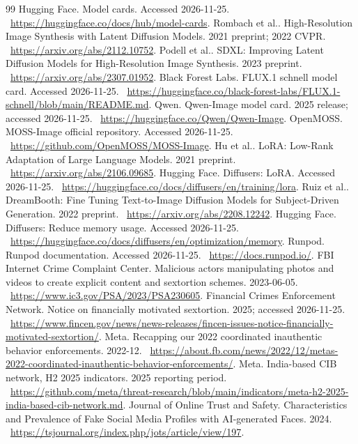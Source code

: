 \documentclass[10pt,a4paper]{article}
\begin{document}
\begin{thebibliography}{99}
 Hugging Face. Model cards. Accessed 2026-11-25. \ \url{https://huggingface.co/docs/hub/model-cards}.
 Rombach et al.. High-Resolution Image Synthesis with Latent Diffusion Models. 2021 preprint; 2022 CVPR. \ \url{https://arxiv.org/abs/2112.10752}.
 Podell et al.. SDXL: Improving Latent Diffusion Models for High-Resolution Image Synthesis. 2023 preprint. \ \url{https://arxiv.org/abs/2307.01952}.
 Black Forest Labs. FLUX.1 schnell model card. Accessed 2026-11-25. \ \url{https://huggingface.co/black-forest-labs/FLUX.1-schnell/blob/main/README.md}.
 Qwen. Qwen-Image model card. 2025 release; accessed 2026-11-25. \ \url{https://huggingface.co/Qwen/Qwen-Image}.
 OpenMOSS. MOSS-Image official repository. Accessed 2026-11-25. \ \url{https://github.com/OpenMOSS/MOSS-Image}.
 Hu et al.. LoRA: Low-Rank Adaptation of Large Language Models. 2021 preprint. \ \url{https://arxiv.org/abs/2106.09685}.
 Hugging Face. Diffusers: LoRA. Accessed 2026-11-25. \ \url{https://huggingface.co/docs/diffusers/en/training/lora}.
 Ruiz et al.. DreamBooth: Fine Tuning Text-to-Image Diffusion Models for Subject-Driven Generation. 2022 preprint. \ \url{https://arxiv.org/abs/2208.12242}.
 Hugging Face. Diffusers: Reduce memory usage. Accessed 2026-11-25. \ \url{https://huggingface.co/docs/diffusers/en/optimization/memory}.
 Runpod. Runpod documentation. Accessed 2026-11-25. \ \url{https://docs.runpod.io/}.
 FBI Internet Crime Complaint Center. Malicious actors manipulating photos and videos to create explicit content and sextortion schemes. 2023-06-05. \ \url{https://www.ic3.gov/PSA/2023/PSA230605}.
 Financial Crimes Enforcement Network. Notice on financially motivated sextortion. 2025; accessed 2026-11-25. \ \url{https://www.fincen.gov/news/news-releases/fincen-issues-notice-financially-motivated-sextortion/}.
 Meta. Recapping our 2022 coordinated inauthentic behavior enforcements. 2022-12. \ \url{https://about.fb.com/news/2022/12/metas-2022-coordinated-inauthentic-behavior-enforcements/}.
 Meta. India-based CIB network, H2 2025 indicators. 2025 reporting period. \ \url{https://github.com/meta/threat-research/blob/main/indicators/meta-h2-2025-india-based-cib-network.md}.
 Journal of Online Trust and Safety. Characteristics and Prevalence of Fake Social Media Profiles with AI-generated Faces. 2024. \ \url{https://tsjournal.org/index.php/jots/article/view/197}.

\end{thebibliography}
\end{document}
